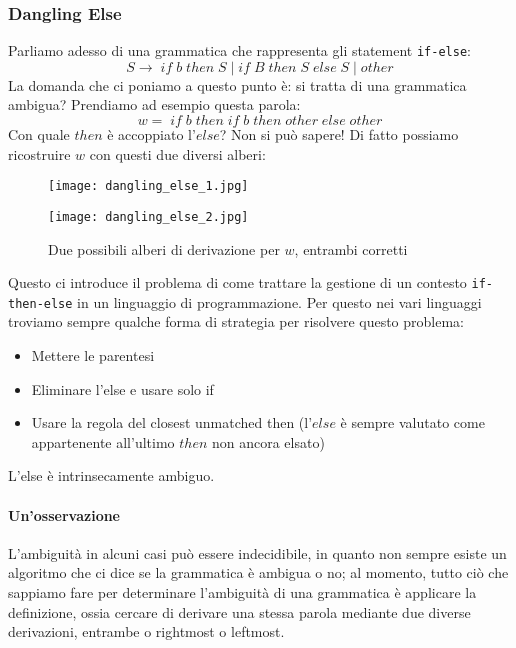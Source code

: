 \documentclass[class=book, crop=false, oneside, 12pt]{standalone}
\begin{document}
\subsubsection*{Dangling Else}
Parliamo adesso di una grammatica che rappresenta gli statement \texttt{if-else}:
\begin{equation}
    S \to \; if \; b \; then \; S \mid if\; B\; then\; S\; else\; S \mid other
\end{equation}
La domanda che ci poniamo a questo punto è: si tratta di una grammatica ambigua? Prendiamo ad esempio questa parola:
\begin{equation}
    \label{dangling_else}
    w =\; if\; b\; then\; if\; b\; then\; other\; else\; other
\end{equation}
Con quale \(then\) è accoppiato l’\(else\)? Non si può sapere! Di fatto possiamo ricostruire \(w\) con questi due diversi alberi:
\begin{figure}[H]
    \begin{minipage}{.5\textwidth}
        \centering
        \texttt{[image: dangling\_else\_1.jpg]}
	\end{minipage}
	\begin{minipage}{.5\textwidth}
        \centering
        \texttt{[image: dangling\_else\_2.jpg]}
    \end{minipage}
    \caption{Due possibili alberi di derivazione per \(w\), entrambi corretti}
    \label{fig:dangling_else}
\end{figure}
Questo ci introduce il problema di come trattare la gestione di un contesto \texttt{if-then-else} in un linguaggio di programmazione.
Per questo nei vari linguaggi troviamo sempre qualche forma di strategia per risolvere questo problema:
\begin{itemize}
    \item Mettere le parentesi
    \item Eliminare l’else e usare solo if
    \item Usare la regola del closest unmatched then (l’\(else\) è sempre valutato come appartenente all’ultimo \(then\) non ancora elsato)
\end{itemize}
L’else è intrinsecamente ambiguo.

\paragraph{Un'osservazione}
L’ambiguità in alcuni casi può essere indecidibile, in quanto non sempre esiste un algoritmo che ci dice se la grammatica è ambigua o no; al momento, tutto ciò che sappiamo fare per determinare l'ambiguità di una grammatica è applicare la definizione, ossia cercare di derivare una stessa parola mediante due diverse derivazioni, entrambe o rightmost o leftmost.
\end{document}
